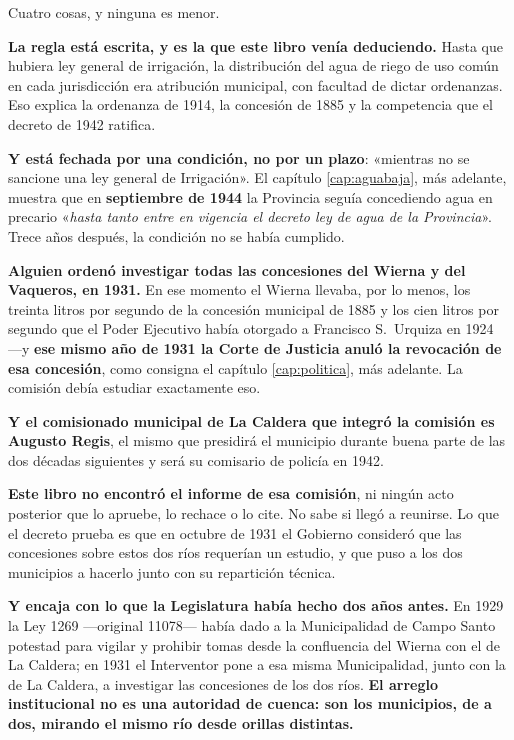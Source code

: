 Cuatro cosas, y ninguna es menor.

\textbf{La regla está escrita, y es la que este libro venía deduciendo.} Hasta que hubiera ley
general de irrigación, la distribución del agua de riego de uso común en cada jurisdicción era
atribución municipal, con facultad de dictar ordenanzas. Eso explica la ordenanza de 1914, la
concesión de 1885 y la competencia que el decreto de 1942 ratifica.

\textbf{Y está fechada por una condición, no por un plazo}: «mientras no se sancione una ley
general de Irrigación». El capítulo \ref{cap:aguabaja}, más adelante, muestra que en \textbf{septiembre de
1944} la Provincia seguía concediendo agua en precario «\textit{hasta tanto entre en vigencia
el decreto ley de agua de la Provincia}». Trece años después, la condición no se había
cumplido.

\textbf{Alguien ordenó investigar todas las concesiones del Wierna y del Vaqueros, en 1931.}
En ese momento el Wierna llevaba, por lo menos, los treinta litros por segundo de la concesión
municipal de 1885 y los cien litros por segundo que el Poder Ejecutivo había otorgado a
Francisco S.\ Urquiza en 1924 ---y \textbf{ese mismo año de 1931
la Corte de Justicia anuló la revocación de esa concesión}, como consigna el capítulo
\ref{cap:politica}, más adelante. La comisión debía estudiar exactamente eso.

\textbf{Y el comisionado municipal de La Caldera que integró la comisión es Augusto Regis}, el
mismo que presidirá el municipio durante buena parte de las dos décadas siguientes y será su
comisario de policía en 1942.

\begin{cautela}
\textbf{Este libro no encontró el informe de esa comisión}, ni ningún acto posterior que lo
apruebe, lo rechace o lo cite. No sabe si llegó a reunirse. Lo que el decreto prueba es que en
octubre de 1931 el Gobierno consideró que las concesiones sobre estos dos ríos requerían un
estudio, y que puso a los dos municipios a hacerlo junto con su repartición técnica.
\end{cautela}

\textbf{Y encaja con lo que la Legislatura había hecho dos años antes.} En 1929 la Ley 1269 ---original 11078--- había dado a la Municipalidad de Campo Santo potestad para vigilar y prohibir tomas desde la confluencia del Wierna con el de La Caldera; en 1931 el Interventor pone a esa misma Municipalidad, junto con la de La Caldera, a investigar las concesiones de los dos ríos. \textbf{El arreglo institucional no es una autoridad de cuenca: son los municipios, de a dos, mirando el mismo río desde orillas distintas.}

